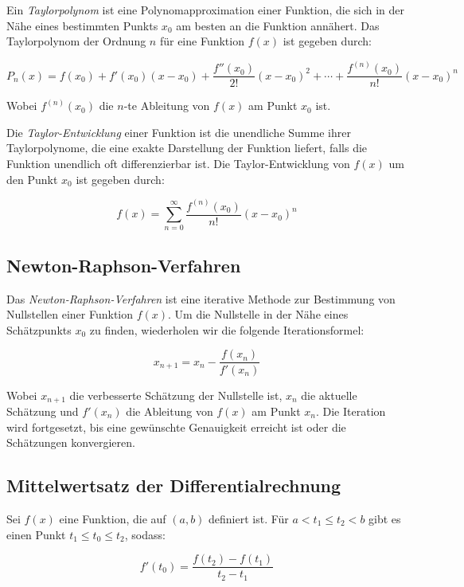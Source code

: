 \documentclass[11pt, openany]{book}
\begin{document}
Ein \emph{Taylorpolynom} ist eine Polynomapproximation einer Funktion, die sich in der Nähe eines bestimmten Punkts $x_0$ am besten an die Funktion annähert. Das Taylorpolynom der Ordnung $n$ für eine Funktion $f(x)$ ist gegeben durch:

\[
P_n(x) = f(x_0) + f'(x_0)(x - x_0) + \frac{f''(x_0)}{2!}(x - x_0)^2 + \cdots + \frac{f^{(n)}(x_0)}{n!}(x - x_0)^n
\]

Wobei $f^{(n)}(x_0)$ die $n$-te Ableitung von $f(x)$ am Punkt $x_0$ ist.

Die \emph{Taylor-Entwicklung} einer Funktion ist die unendliche Summe ihrer Taylorpolynome, die eine exakte Darstellung der Funktion liefert, falls die Funktion unendlich oft differenzierbar ist. Die Taylor-Entwicklung von $f(x)$ um den Punkt $x_0$ ist gegeben durch:
\begin{tcolorbox}
\[
f(x) = \sum_{n=0}^{\infty} \frac{f^{(n)}(x_0)}{n!}(x - x_0)^n
\]    
\end{tcolorbox}


\subsection{Newton-Raphson-Verfahren}

Das \emph{Newton-Raphson-Verfahren} ist eine iterative Methode zur Bestimmung von Nullstellen einer Funktion $f(x)$. Um die Nullstelle in der Nähe eines Schätzpunkts $x_0$ zu finden, wiederholen wir die folgende Iterationsformel:
\begin{tcolorbox}
\[
x_{n+1} = x_n - \frac{f(x_n)}{f'(x_n)}
\]    
\end{tcolorbox}


Wobei $x_{n+1}$ die verbesserte Schätzung der Nullstelle ist, $x_n$ die aktuelle Schätzung und $f'(x_n)$ die Ableitung von $f(x)$ am Punkt $x_n$. Die Iteration wird fortgesetzt, bis eine gewünschte Genauigkeit erreicht ist oder die Schätzungen konvergieren.

\newpage

\subsection{Mittelwertsatz der Differentialrechnung}
Sei $f(x)$ eine Funktion, die auf $(a, b)$ definiert ist. Für $a < t_1 \leq t_2 < b$ gibt es einen Punkt $t_1 \leq t_0 \leq t_2$, sodass:

\[
f'(t_0) = \frac{f(t_2) - f(t_1)}{t_2 - t_1}
\]
\end{document}

